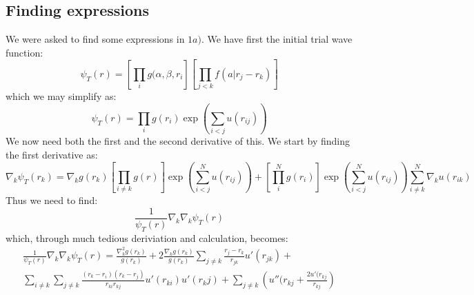 \documentclass{article}
\begin{document}
\subsection{Finding expressions} \label{app1}
We were asked to find some expressions in $1a)$.
\newline
We have first the initial trial wave function:
\begin{equation*}
    \psi_T (r) = \left[ \prod_i g(\alpha, \beta, r_i \right] \left[ \prod_{j<k} f(a|r_j - r_k) \right]
\end{equation*}
which we may simplify as:
\begin{equation*}
    \psi_T (r) = \prod_i g(r_i) \exp \left(\sum_{i<j} u(r_{ij}) \right)
\end{equation*}
We now need both the first and the second derivative of this. We start by finding the first derivative as:
\begin{equation*}
    \nabla_k \psi_T (r_k) = \nabla_k g(r_k) \left[ \prod_{i\neq k} g(r) \right] \exp \left( \sum_{i<j}^N u(r_{ij}) \right) + \left[\prod_i^N g(r_i) \right] \exp \left( \sum_{i<j}^N u(r_{ij}) \right)  \sum_{i \neq k}^N \nabla_k u(r_{ik})
\end{equation*}
Thus we need to find:
\begin{equation*}
    \frac{1}{\psi_T (r)} \nabla_k \nabla_k \psi_T (r)
\end{equation*}
which, through much tedious deriviation and calculation, becomes:
\begin{equation}
\boxed{
\begin{split} 
    \frac{1}{\psi_T (r)} \nabla_k \nabla_k \psi_T(r) = \frac{\nabla_k^2 g(r_k)}{g(r_k)} + 2 \frac{\nabla_k g(r_k)}{g(r_k)} \sum_{j\neq k} \frac{r_j - r_k}{r_{jk}} u'(r_{jk}) + \\ \sum_{i\neq k} \sum_{j\neq k} \frac{(r_k - r_i)(r_k - r_j)}{r_{ki} r_{kj}} u'(r_{ki}) u'(r_kj) + \sum_{j\neq k} \left( u''(r_{kj} + \frac{2u'(r_{kj}}{r_{kj}}\right)
\end{split}}
\end{equation}
\end{document}
